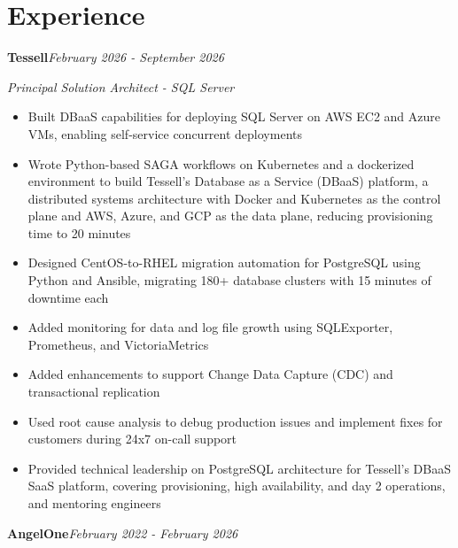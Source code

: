\documentclass[10pt,a4paper]{article}
\begin{document}
\section{Experience}

\noindent\textbf{Tessell}\hfill \textit{February 2026 - September 2026}

\textit{Principal Solution Architect - SQL Server}\\[-5pt]
\begin{itemize}
  \item Built DBaaS capabilities for deploying SQL Server on AWS EC2 and Azure VMs, enabling self-service concurrent deployments
  \item Wrote Python-based SAGA workflows on Kubernetes and a dockerized environment to build Tessell's Database as a Service (DBaaS) platform, a distributed systems architecture with Docker and Kubernetes as the control plane and AWS, Azure, and GCP as the data plane, reducing provisioning time to 20 minutes
  \item Designed CentOS-to-RHEL migration automation for PostgreSQL using Python and Ansible, migrating 180+ database clusters with 15 minutes of downtime each
  \item Added monitoring for data and log file growth using SQLExporter, Prometheus, and VictoriaMetrics
  \item Added enhancements to support Change Data Capture (CDC) and transactional replication
  \item Used root cause analysis to debug production issues and implement fixes for customers during 24x7 on-call support
  \item Provided technical leadership on PostgreSQL architecture for Tessell's DBaaS SaaS platform, covering provisioning, high availability, and day 2 operations, and mentoring engineers
\end{itemize}
\vspace{14.7pt}
\noindent\textbf{AngelOne}\hfill \textit{February 2022 - February 2026}
\end{document}
